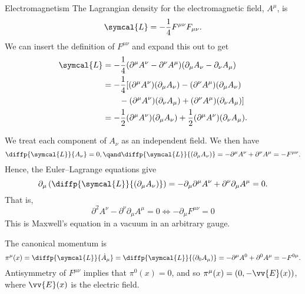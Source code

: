 \documentclass[fleqn]{NotesClass}
\newcommand{\dalembertian}{\partial^2}
\newcommand{\lagrangianDensity}{\symcal{L}}
\begin{document}
    \begin{exm}{Electromagnetism}{}
        The Lagrangian density for the electromagnetic field, \(A^\mu\), is
        \begin{equation}
            \lagrangianDensity = -\frac{1}{4}F^{\mu\nu}F_{\mu\nu}.
        \end{equation}
        We can insert the definition of \(F^{\mu\nu}\) and expand this out to get
        \begin{align}
            \lagrangianDensity &= -\frac{1}{4}(\partial^\mu A^\nu - \partial^\nu A^\mu)(\partial_\mu A_\nu - \partial_\nu A_\mu)\\
            &= -\frac{1}{4}[(\partial^\mu A^\nu)(\partial_\mu A_\nu) - (\partial^\nu A^\mu)(\partial_\mu A_\nu)\\
            &\qquad- (\partial^\mu A^\nu)(\partial_\nu A_\mu) + (\partial^\nu A^\mu)(\partial_\nu A_\mu)]\\
            &= -\frac{1}{2}(\partial^\mu A^\nu)(\partial_\mu A_\nu) + \frac{1}{2}(\partial^\mu A^\nu)(\partial_\nu A_\mu).
        \end{align}
        
        We treat each component of \(A_\nu\) as an independent field.
        We then have
        \begin{equation}
            \diffp{\lagrangianDensity}{A_\nu} = 0, \qand \diffp{\lagrangianDensity}{(\partial_\mu A_\nu)} = -\partial^\mu A^\nu + \partial^\nu A^\mu = -F^{\mu\nu}.
        \end{equation}
        Hence, the Euler--Lagrange equations give
        \begin{equation}
            \partial_\mu\left( \diffp{\lagrangianDensity}{(\partial_\mu A_\nu)} \right) = -\partial_\mu \partial^\mu A^\nu + \partial^\nu \partial_\mu A^\mu = 0.
        \end{equation}
        That is,
        \begin{equation}
            \dalembertian A^\nu - \partial^\nu \partial_\mu A^\mu = 0 \iff -\partial_\mu F^{\mu\nu} = 0
        \end{equation}
        This is Maxwell's equation in a vacuum in an arbitrary gauge.
        
        The canonical momentum is
        \begin{equation}
            \pi^\mu(x) = \diffp{\lagrangianDensity}{\dot{A}_\mu} = \diffp{\lagrangianDensity}{(\partial_0 A_\mu)} = -\partial^\mu A^0 + \partial^0 A^\mu = -F^{0\mu}.
        \end{equation}
        Antisymmetry of \(F^{\mu\nu}\) implies that \(\pi^0(x) = 0\), and so \(\pi^\mu(x) = (0, -\vv{E}(x))\), where \(\vv{E}(x)\) is the electric field.
        

\end{exm}
\end{document}
